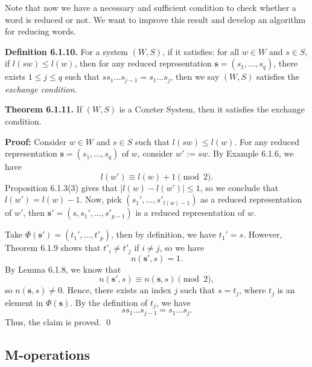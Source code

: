 \documentclass[../main.tex]{subfiles}
\begin{document}
\vspace{\baselineskip}

\noindent
Note that now we have a necessary and sufficient condition to check whether a word is reduced or not. We want to improve this result and develop an algorithm for reducing words. 

\vspace{\baselineskip}

\noindent \textbf{Definition 6.1.10.} For a system $(W, S)$, if it satisfies: for all $w \in W$ and $s \in S$, if $l(sw) \leq l(w)$, then for any reduced representation $\mathbf{s} = (s_1, \dots, s_q)$, there exists $1 \leq j \leq q$ such that $s s_1 \dots s_{j-1} = s_1 \dots s_j$, then we say $(W, S)$ satisfies the \textit{exchange condition}.

\vspace{\baselineskip}

\noindent \textbf{Theorem 6.1.11.} If $(W, S)$ is a Coxeter System, then it satisfies the exchange condition.

\vspace{0.5\baselineskip}

\noindent \textbf{Proof:} Consider $w \in W$ and $s \in S$ such that $l(sw) \leq l(w)$. For any reduced representation $\mathbf{s} = (s_1, \dots, s_q)$ of $w$, consider $w' := sw$. By Example 6.1.6, we have
\[
l(w') \equiv l(w) + 1 \pmod{2}.
\]
Proposition 6.1.3(3) gives that $|l(w) - l(w')| \leq 1$, so we conclude that $l(w') = l(w) - 1$. Now, pick $(s_1', \dots, s'_{l(w)-1})$ as a reduced representation of $w'$, then $\mathbf{s'} = (s, s_1', \dots, s'_{p-1})$ is a reduced representation of $w$. 

Take $\Phi(\mathbf{s'}) = (t_1', \dots, t'_p)$, then by definition, we have $t_1' = s$. However, Theorem 6.1.9 shows that $t'_i \neq t'_j$ if $i \neq j$, so we have
\[
n(\mathbf{s'}, s) = 1.
\]
By Lemma 6.1.8, we know that
\[
n(\mathbf{s'}, s) \equiv n(\mathbf{s}, s) \pmod{2},
\]
so $n(\mathbf{s}, s) \neq 0$. Hence, there exists an index $j$ such that $s = t_j$, where $t_j$ is an element in $\Phi(\mathbf{s})$. By the definition of $t_j$, we have
\[
s s_1 \dots s_{j-1} = s_1 \dots s_j.
\]
Thus, the claim is proved. \qed

\vspace{\baselineskip}

\subsection{M-operations}
\end{document}
